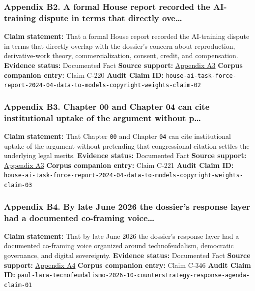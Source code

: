 \documentclass[
  american,
  11pt,
  letterpaper,
]{article}
\begin{document}
\subsubsection{Appendix B2. A formal House report recorded the
AI-training dispute in terms that directly
ove\ldots{}}\label{ch-00-appendix-b2-a-formal-house-report-recorded-the-ai-training-dispute-in-terms-that-directly-ove}

\textbf{Claim statement:} That a formal House report recorded the
AI-training dispute in terms that directly overlap with the dossier's
concern about reproduction, derivative-work theory, commercialization,
consent, credit, and compensation. \textbf{Evidence status:} Documented
Fact \textbf{Source support:}
\hyperref[ch-00-appendix-a3-bipartisan-house-task-force-report-on-artificial-intelligence]{Appendix
A3} \textbf{Corpus companion entry:} Claim C-220 \textbf{Audit Claim
ID:}
\texttt{house-ai-task-force-report-2024-04-data-to-models-copyright-weights-claim-02}

\subsubsection{Appendix B3. Chapter 00 and Chapter 04 can cite
institutional uptake of the argument without
p\ldots{}}\label{ch-00-appendix-b3-chapter-00-and-chapter-04-can-cite-institutional-uptake-of-the-argument-without-p}

\textbf{Claim statement:} That Chapter \texttt{00} and Chapter
\texttt{04} can cite institutional uptake of the argument without
pretending that congressional citation settles the underlying legal
merits. \textbf{Evidence status:} Documented Fact \textbf{Source
support:}
\hyperref[ch-00-appendix-a3-bipartisan-house-task-force-report-on-artificial-intelligence]{Appendix
A3} \textbf{Corpus companion entry:} Claim C-221 \textbf{Audit Claim
ID:}
\texttt{house-ai-task-force-report-2024-04-data-to-models-copyright-weights-claim-03}

\subsubsection{Appendix B4. By late June 2026 the dossier's response
layer had a documented co-framing
voice\ldots{}}\label{ch-00-appendix-b4-by-late-june-2026-the-dossier-s-response-layer-had-a-documented-co-framing-voice}

\textbf{Claim statement:} That by late June 2026 the dossier's response
layer had a documented co-framing voice organized around
technofeudalism, democratic governance, and digital sovereignty.
\textbf{Evidence status:} Documented Fact \textbf{Source support:}
\hyperref[ch-00-appendix-a4-c-mo-hackear-al-tecnofeudalismo]{Appendix
A4} \textbf{Corpus companion entry:} Claim C-346 \textbf{Audit Claim
ID:}
\texttt{paul-lara-tecnofeudalismo-2026-10-counterstrategy-response-agenda-claim-01}
\end{document}
